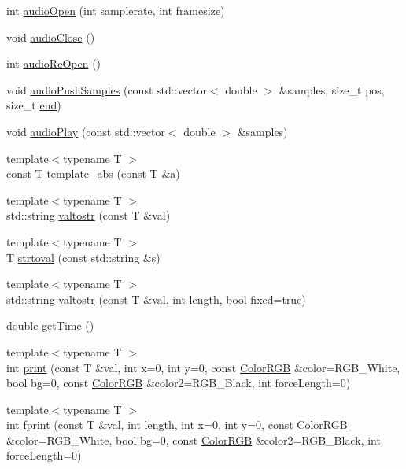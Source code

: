 \begin{DoxyCompactItemize}
\item 
int \hyperlink{namespaceQuickCG_ae5966f7415b22412d861e47958d4f5db}{audio\-Open} (int samplerate, int framesize)
\item 
void \hyperlink{namespaceQuickCG_a7553e7725f3705b87a391dbca2cfe236}{audio\-Close} ()
\item 
int \hyperlink{namespaceQuickCG_a201d151e8bc1ec58ba4378dc7cfdf5f2}{audio\-Re\-Open} ()
\item 
void \hyperlink{namespaceQuickCG_a90c3e59d89a886ab6603c2ca1a44dd29}{audio\-Push\-Samples} (const std\-::vector$<$ double $>$ \&samples, size\-\_\-t pos, size\-\_\-t \hyperlink{namespaceQuickCG_a3f2f6f46ae7da8905177080c7a6697bb}{end})
\item 
void \hyperlink{namespaceQuickCG_afa7b6514ece0f5f331ee8ff11f741d38}{audio\-Play} (const std\-::vector$<$ double $>$ \&samples)
\item 
{\footnotesize template$<$typename T $>$ }\\const T \hyperlink{namespaceQuickCG_ac1a231e2857d21dae271a40e9832512a}{template\-\_\-abs} (const T \&a)
\item 
{\footnotesize template$<$typename T $>$ }\\std\-::string \hyperlink{namespaceQuickCG_a636cd1485648787aabf790a0f479bf4a}{valtostr} (const T \&val)
\item 
{\footnotesize template$<$typename T $>$ }\\T \hyperlink{namespaceQuickCG_aa5e87cb12327ca23aaa732a3aa8386aa}{strtoval} (const std\-::string \&s)
\item 
{\footnotesize template$<$typename T $>$ }\\std\-::string \hyperlink{namespaceQuickCG_a09e2d278caef33b316b15830f70ce1bd}{valtostr} (const T \&val, int length, bool fixed=true)
\item 
double \hyperlink{namespaceQuickCG_a484df0e7cbe743fcb4ef2ee2b663cd33}{get\-Time} ()
\item 
{\footnotesize template$<$typename T $>$ }\\int \hyperlink{namespaceQuickCG_a1712cf129e6bce7fa7b21edc32b49026}{print} (const T \&val, int x=0, int y=0, const \hyperlink{structQuickCG_1_1ColorRGB}{Color\-R\-G\-B} \&color=R\-G\-B\-\_\-\-White, bool bg=0, const \hyperlink{structQuickCG_1_1ColorRGB}{Color\-R\-G\-B} \&color2=R\-G\-B\-\_\-\-Black, int force\-Length=0)
\item 
{\footnotesize template$<$typename T $>$ }\\int \hyperlink{namespaceQuickCG_ad7d6143c1d4e0c1851290912bac33d69}{fprint} (const T \&val, int length, int x=0, int y=0, const \hyperlink{structQuickCG_1_1ColorRGB}{Color\-R\-G\-B} \&color=R\-G\-B\-\_\-\-White, bool bg=0, const \hyperlink{structQuickCG_1_1ColorRGB}{Color\-R\-G\-B} \&color2=R\-G\-B\-\_\-\-Black, int force\-Length=0)

\end{DoxyCompactItemize}
